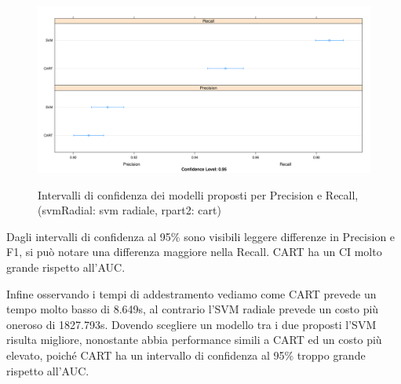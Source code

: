 \begin{figure}[H]
    \centering
    \includegraphics[width=\linewidth]{images/comparison/best/best_dotplot_pr.png}
     \label{fig:c21_modelli_proposti}
    \caption{Intervalli di confidenza dei modelli proposti per Precision e Recall, (svmRadial: svm radiale, rpart2: cart)}
\end{figure}

\noindent
Dagli intervalli di confidenza al 95\% sono visibili leggere differenze in Precision e F1, si può notare una differenza maggiore nella Recall. CART ha un CI molto grande rispetto all'AUC.

\vspace{5mm}
\noindent
Infine osservando i tempi di addestramento vediamo come CART prevede un tempo molto basso di 8.649s, al contrario l'SVM radiale prevede un costo più oneroso di 1827.793s. Dovendo scegliere un modello tra i due proposti l'SVM risulta migliore, nonostante abbia performance simili a CART ed un costo più elevato, poiché CART ha un intervallo di confidenza al 95\% troppo grande rispetto all'AUC.

